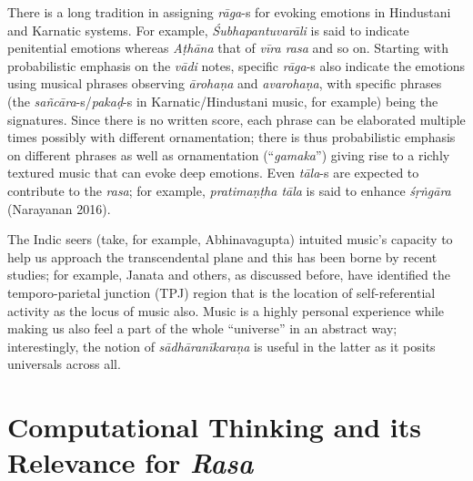There is a long tradition in assigning \textsl{rāga}-s for evoking emotions in Hindustani and Karnatic systems. For example, \textsl{Śubhapantuvarāli} is said to indicate penitential emotions whereas \textsl{Aṭhāna} that of \textsl{vīra rasa} and so on. Starting with probabilistic emphasis on the \textsl{vādi} notes, specific \textsl{rāga}-s also indicate the emotions using musical phrases observing \textsl{ārohaṇa} and \textsl{avarohaṇa}, with specific phrases (the \textsl{sañcāra}-s/\textsl{pakaḍ}-s in Karnatic/Hindustani music, for example) being the signatures. Since there is no written score, each phrase can be elaborated multiple times possibly with different ornamentation; there is thus probabilistic emphasis on different phrases as well as ornamentation (“\textsl{gamaka}”) giving rise to a richly textured music that can evoke deep emotions. Even \textsl{tāla}-s are expected to contribute to the \textsl{rasa}; for example, \textsl{pratimaṇṭha tāla} is said to enhance \textsl{śṛṅgāra} (Narayanan 2016). 

The Indic seers (take, for example, Abhinavagupta) intuited music’s capacity to help us approach the transcendental plane and this has been borne by recent studies; for example, Janata and others, as discussed before, have identified the temporo-parietal junction (TPJ) region that is the location of self-referential activity as the locus of music also. Music is a highly personal experience while making us also feel a part of the whole “universe” in an abstract way; interestingly, the notion of \textsl{sādhāranīkaraṇa} is useful in the latter as it posits universals across all.\\[-21pt]

\section{Computational Thinking and its Relevance for \textsl{Rasa}}\label{chap3-sec5}

